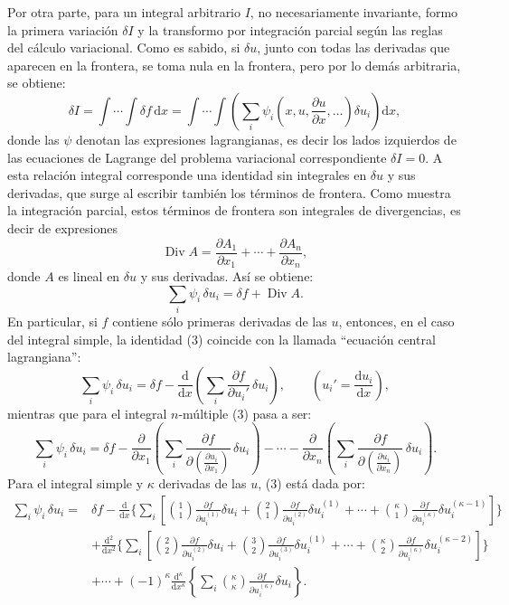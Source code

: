 \documentclass[11pt]{article}
\providecommand{\dd}{\mathrm d}
\providecommand{\Div}{\operatorname{Div}}
\providecommand{\p}{\partial}
\begin{document}
Por otra parte, para un integral arbitrario \(I\), no necesariamente invariante, formo la primera variación \(\delta I\) y la transformo por integración parcial según las reglas del cálculo variacional. Como es sabido, si \(\delta u\), junto con todas las derivadas que aparecen en la frontera, se toma nula en la frontera, pero por lo demás arbitraria, se obtiene:
\begin{equation}
\delta I=\int\!\cdots\!\int \delta f\,\dd x
=\int\!\cdots\!\int\left(\sum_i\psi_i\!\left(x,u,\frac{\p u}{\p x},\ldots\right)\delta u_i\right)\dd x,
\tag{2}
\end{equation}
donde las \(\psi\) denotan las expresiones lagrangianas, es decir los lados izquierdos de las ecuaciones de Lagrange del problema variacional correspondiente \(\delta I=0\). A esta relación integral corresponde una identidad sin integrales en \(\delta u\) y sus derivadas, que surge al escribir también los términos de frontera. Como muestra la integración parcial, estos términos de frontera son integrales de divergencias, es decir de expresiones
\[
\Div A=\frac{\p A_1}{\p x_1}+\cdots+\frac{\p A_n}{\p x_n},
\]
donde \(A\) es lineal en \(\delta u\) y sus derivadas. Así se obtiene:
\begin{equation}
\sum_i\psi_i\,\delta u_i=\delta f+\Div A.
\tag{3}
\end{equation}
En particular, si \(f\) contiene sólo primeras derivadas de las \(u\), entonces, en el caso del integral simple, la identidad (3) coincide con la llamada ``ecuación central lagrangiana'':
\begin{equation}
\sum_i \psi_i\,\delta u_i
=\delta f-\frac{\dd}{\dd x}\left(\sum_i\frac{\p f}{\p u_i'}\,\delta u_i\right),
\qquad \left(u_i'=\frac{\dd u_i}{\dd x}\right),
\tag{4}
\end{equation}
mientras que para el integral \(n\)-múltiple (3) pasa a ser:
\begin{equation}
\sum_i\psi_i\,\delta u_i
=
\delta f
-\frac{\p}{\p x_1}\left(\sum_i\frac{\p f}{\p \left(\frac{\p u_i}{\p x_1}\right)}\,\delta u_i\right)
-\cdots
-\frac{\p}{\p x_n}\left(\sum_i\frac{\p f}{\p \left(\frac{\p u_i}{\p x_n}\right)}\,\delta u_i\right).
\tag{5}
\end{equation}
Para el integral simple y \(\kappa\) derivadas de las \(u\), (3) está dada por:
\begin{equation}
\begin{aligned}
\sum_i\psi_i\,\delta u_i
={}&\delta f
-\frac{\dd}{\dd x}\Bigg\{\sum_i\left[
\binom{1}{1}\frac{\p f}{\p u_i^{(1)}}\delta u_i
+\binom{2}{1}\frac{\p f}{\p u_i^{(2)}}\delta u_i^{(1)}
+\cdots+
\binom{\kappa}{1}\frac{\p f}{\p u_i^{(\kappa)}}\delta u_i^{(\kappa-1)}
\right]\Bigg\}\\
&+\frac{\dd^2}{\dd x^2}\Bigg\{\sum_i\left[
\binom{2}{2}\frac{\p f}{\p u_i^{(2)}}\delta u_i
+\binom{3}{2}\frac{\p f}{\p u_i^{(3)}}\delta u_i^{(1)}
+\cdots+
\binom{\kappa}{2}\frac{\p f}{\p u_i^{(\kappa)}}\delta u_i^{(\kappa-2)}
\right]\Bigg\}\\
&+\cdots
+(-1)^\kappa\frac{\dd^\kappa}{\dd x^\kappa}
\left\{\sum_i\binom{\kappa}{\kappa}
\frac{\p f}{\p u_i^{(\kappa)}}\delta u_i\right\}.
\end{aligned}
\tag{6}
\end{equation}
\end{document}
